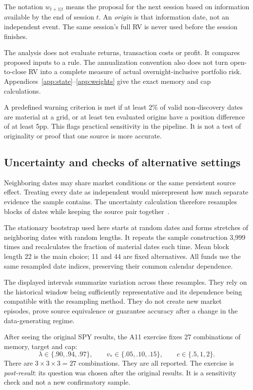 The notation $w_{t+1|t}$ means the proposal for the next session based on information available by the end of session $t$. An \emph{origin} is that information date, not an independent event. The same session's full RV is never used before the session finishes.

The analysis does not evaluate returns, transaction costs or profit. It compares proposed inputs to a rule. The annualization convention also does not turn open-to-close RV into a complete measure of actual overnight-inclusive portfolio risk. Appendices~\ref{app:state}--\ref{app:weights} give the exact memory and cap calculations.

A predefined warning criterion is met if at least 2\% of valid non-discovery dates are material at a grid, or at least ten evaluated origins have a position difference of at least 5pp. This flags practical sensitivity in the pipeline. It is not a test of originality or proof that one source is more accurate.

\subsection{Uncertainty and checks of alternative settings}
Neighboring dates may share market conditions or the same persistent source effect. Treating every date as independent would misrepresent how much separate evidence the sample contains. The uncertainty calculation therefore resamples blocks of dates while keeping the source pair together~\cite{politis}.

The stationary bootstrap used here starts at random dates and forms stretches of neighboring dates with random lengths. It repeats the sample construction 3,999 times and recalculates the fraction of material dates each time. Mean block length 22 is the main choice; 11 and 44 are fixed alternatives. All funds use the same resampled date indices, preserving their common calendar dependence.

The displayed intervals summarize variation across these resamples. They rely on the historical window being sufficiently representative and its dependence being compatible with the resampling method. They do not create new market episodes, prove source equivalence or guarantee accuracy after a change in the data-generating regime.

After seeing the original SPY results, the A11 exercise fixes 27 combinations of memory, target and cap:
\[
 \lambda\in\{.90,.94,.97\},\qquad
 v_*\in\{.05,.10,.15\},\qquad c\in\{.5,1,2\}.
\]
There are $3\times3\times3=27$ combinations. They are all reported. The exercise is \emph{post-result}: its question was chosen after the original results. It is a sensitivity check and not a new confirmatory sample.

